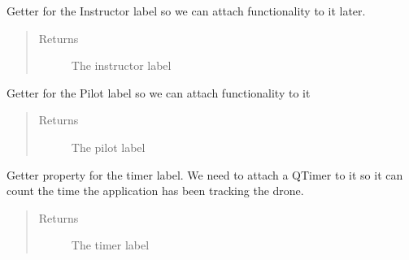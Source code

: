 \documentclass[letterpaper,10pt,english]{sphinxmanual}
\begin{document}
\begin{fulllineitems}
\begin{fulllineitems}
\begin{quote}
\begin{description}
\end{description}\end{quote}

\end{fulllineitems}


\begin{fulllineitems}
\label{\detokenize{index:src.Views.View_TrackingScreen.TrackingWindow.del_LblInstructor}}
Getter for the Instructor label so we can attach functionality to it later.
\begin{quote}\begin{description}
\item[{Returns}] \leavevmode
The instructor label

\end{description}\end{quote}

\end{fulllineitems}


\begin{fulllineitems}
\label{\detokenize{index:src.Views.View_TrackingScreen.TrackingWindow.del_LblPilot}}
Getter for the Pilot label so we can attach functionality to it
\begin{quote}\begin{description}
\item[{Returns}] \leavevmode
The pilot label

\end{description}\end{quote}

\end{fulllineitems}


\begin{fulllineitems}
\label{\detokenize{index:src.Views.View_TrackingScreen.TrackingWindow.del_LblTimer}}
Getter property for the timer label. We need to attach a QTimer to it so it can count the time the
application has been tracking the drone.
\begin{quote}\begin{description}
\item[{Returns}] \leavevmode
The timer label


\end{description}
\end{quote}
\end{fulllineitems}
\end{fulllineitems}
\end{document}
